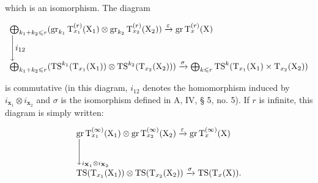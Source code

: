 which is an isomorphism. The diagram

\[
\begin{array}{l} \bigoplus_ {k _ {1} + k _ {2} \leqslant r} (\operatorname{gr} _ {k _ {1}} \mathrm{T} _ {x _ {1}} ^ {(r)} (\mathrm{X} _ {1}) \otimes \operatorname{gr} _ {k _ {2}} \mathrm{T} _ {x _ {2}} ^ {(r)} (\mathrm{X} _ {2})) \xrightarrow {\varepsilon} \operatorname{gr} \mathrm{T} _ {x} ^ {(r)} (\mathrm{X}) \\ \Biggl \downarrow i _ {1 2} \\ \bigoplus_ {k _ {1} + k _ {2} \leqslant r} (\mathrm{TS} ^ {k _ {1}} (\mathrm{T} _ {x _ {1}} (\mathrm{X} _ {1})) \otimes \mathrm{TS} ^ {k _ {2}} (\mathrm{T} _ {x _ {2}} (\mathrm{X} _ {2}))) \xrightarrow {\sigma} \bigoplus_ {k \leqslant r} \mathrm{TS} ^ {k} (\mathrm{T} _ {x _ {1}} (\mathrm{X} _ {1}) \times \mathrm{T} _ {x _ {2}} (\mathrm{X} _ {2})) \end{array}
\]

is commutative (in this diagram, \(i_{12}\) denotes the homomorphism induced by \(i_{\mathbf{x}_1} \otimes i_{\mathbf{x}_2}\) and \(\sigma\) is the isomorphism defined in A, IV, § 5, no. 5). If \(r\) is infinite, this diagram is simply written:

\[
\begin{array}{l} \operatorname{gr} \mathrm{T} _ {x _ {1}} ^ {(\infty)} (\mathrm{X} _ {1}) \otimes \operatorname{gr} \mathrm{T} _ {x _ {2}} ^ {(\infty)} (\mathrm{X} _ {2}) \xrightarrow {\varepsilon} \operatorname{gr} \mathrm{T} _ {x} ^ {(\infty)} (\mathrm{X}) \\ \Biggl \downarrow_ {i _ {\mathbf {X} _ {1}} \otimes i _ {\mathbf {X} _ {2}}} \\ \operatorname{TS} (\mathrm{T} _ {x _ {1}} (\mathrm{X} _ {1})) \otimes \operatorname{TS} (\mathrm{T} _ {x _ {2}} (\mathrm{X} _ {2})) \xrightarrow {\sigma} \operatorname{TS} (\mathrm{T} _ {x} (\mathrm{X})). \end{array}
\]

